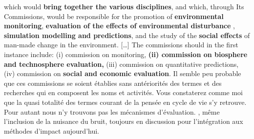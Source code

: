 {%
which would \textbf{bring together the various disciplines}, and which, through Its Commissions, would be responsible for the promotion of \textbf{environmental monitoring}, \textbf{evaluation of the effects of environmental disturbance} , \textbf{simulation modelling and predictions}, and the study of the \textbf{social effects} of man-made change in the environment.
[\ldots]
The commissions should in the first instance include:
(i) commission on monitoring,
\textbf{(ii) commission on biosphere and technosphere evaluation,}
(iii) commission on quantitative predictions,
(iv) commission on \textbf{social and economic evaluation}.}
Il semble peu probable que ces commissions se soient établies sans antériorités des termes et des recherches qui en composent les noms et activités.
Vous constaterez comme moi que la quasi totalité des termes courant de la pensée en cycle de vie s'y retrouve.
Pour autant nous n'y trouvons pas les mécanismes d'évaluation.
, même l'inclusion de la nuisance du bruit, toujours en discussion pour l'intégration aux méthodes d'impact aujourd'hui.



